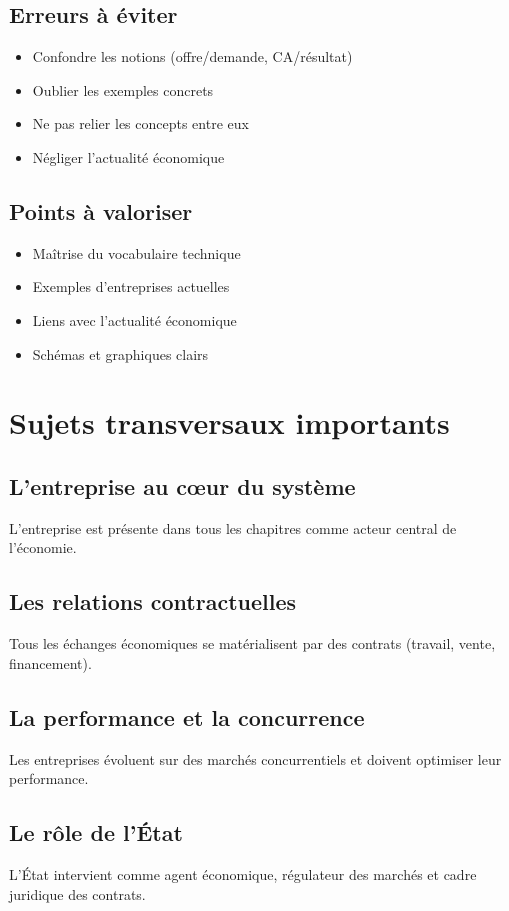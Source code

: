 \documentclass[12pt,a4paper]{article}
\begin{document}
\subsection{Erreurs à éviter}
\begin{itemize}
    \item Confondre les notions (offre/demande, CA/résultat)
    \item Oublier les exemples concrets
    \item Ne pas relier les concepts entre eux
    \item Négliger l'actualité économique
\end{itemize}

\subsection{Points à valoriser}
\begin{itemize}
    \item Maîtrise du vocabulaire technique
    \item Exemples d'entreprises actuelles
    \item Liens avec l'actualité économique
    \item Schémas et graphiques clairs
\end{itemize}

\section{Sujets transversaux importants}

\subsection{L'entreprise au cœur du système}
L'entreprise est présente dans tous les chapitres comme acteur central de l'économie.

\subsection{Les relations contractuelles}
Tous les échanges économiques se matérialisent par des contrats (travail, vente, financement).

\subsection{La performance et la concurrence}
Les entreprises évoluent sur des marchés concurrentiels et doivent optimiser leur performance.

\subsection{Le rôle de l'État}
L'État intervient comme agent économique, régulateur des marchés et cadre juridique des contrats.
\end{document}
